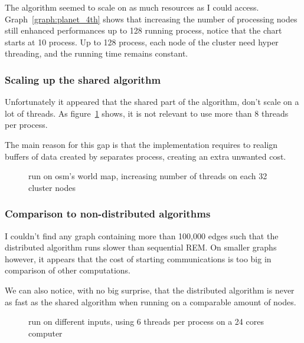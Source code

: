 \documentclass[12px]{article}
\begin{document}
      The algorithm seemed to scale on as much resources as I could access.
      Graph~\ref{graph:planet_4th} shows that increasing the number of processing nodes still enhanced performances up to 128 running process, notice that the chart starts at 10 process. Up to 128 process, each node of the cluster need hyper threading, and the running time remains constant.

      \subsubsection{Scaling up the shared algorithm}
        Unfortunately it appeared that the shared part of the algorithm, don't scale on a lot of threads.
        As figure~\ref{graph:planet_incthreads} shows, it is not relevant to use more than 8 threads per process.

        The main reason for this gap is that the implementation requires to realign buffers of data created by separates process, creating an extra unwanted cost.

        \begin{figure}[H]
          \label{graph:planet_incthreads}
          \caption{run on osm's world map, increasing number of threads on each 32 cluster nodes}
          \centering
          \scalebox{0.7}{}
        \end{figure}

      \subsubsection{Comparison to non-distributed algorithms}
        I couldn't find any graph containing more than 100,000 edges such that the distributed algorithm runs slower than sequential REM\@.
        On smaller graphs however, it appears that the cost of starting communications is too big in comparison of other computations.

        We can also notice, with no big surprise, that the distributed algorithm is never as fast as the shared algorithm when running on a comparable amount of nodes.

      \begin{figure}[H]
        \label{graph:cmpinputs}
        \caption{run on different inputs, using 6 threads per process on a 24 cores computer}
        \centering
        \scalebox{0.4}{}
        \scalebox{0.4}{}
        \scalebox{0.4}{}
      \end{figure}
\end{document}
